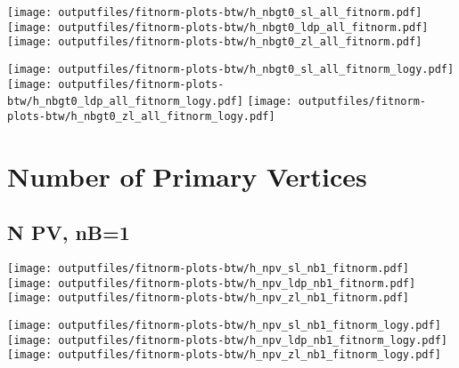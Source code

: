 \documentclass[11pt]{article}
\begin{document}
    \noindent
     \texttt{[image: outputfiles/fitnorm-plots-btw/h\_nbgt0\_sl\_all\_fitnorm.pdf]}
     \texttt{[image: outputfiles/fitnorm-plots-btw/h\_nbgt0\_ldp\_all\_fitnorm.pdf]}
     \texttt{[image: outputfiles/fitnorm-plots-btw/h\_nbgt0\_zl\_all\_fitnorm.pdf]}

    \noindent
     \texttt{[image: outputfiles/fitnorm-plots-btw/h\_nbgt0\_sl\_all\_fitnorm\_logy.pdf]}
     \texttt{[image: outputfiles/fitnorm-plots-btw/h\_nbgt0\_ldp\_all\_fitnorm\_logy.pdf]}
     \texttt{[image: outputfiles/fitnorm-plots-btw/h\_nbgt0\_zl\_all\_fitnorm\_logy.pdf]}







    \section{Number of Primary Vertices }

    \subsection{ N PV, nB=1 }

    \noindent
     \texttt{[image: outputfiles/fitnorm-plots-btw/h\_npv\_sl\_nb1\_fitnorm.pdf]}
     \texttt{[image: outputfiles/fitnorm-plots-btw/h\_npv\_ldp\_nb1\_fitnorm.pdf]}
     \texttt{[image: outputfiles/fitnorm-plots-btw/h\_npv\_zl\_nb1\_fitnorm.pdf]}

    \noindent
     \texttt{[image: outputfiles/fitnorm-plots-btw/h\_npv\_sl\_nb1\_fitnorm\_logy.pdf]}
     \texttt{[image: outputfiles/fitnorm-plots-btw/h\_npv\_ldp\_nb1\_fitnorm\_logy.pdf]}
     \texttt{[image: outputfiles/fitnorm-plots-btw/h\_npv\_zl\_nb1\_fitnorm\_logy.pdf]}





  
\end{document}
